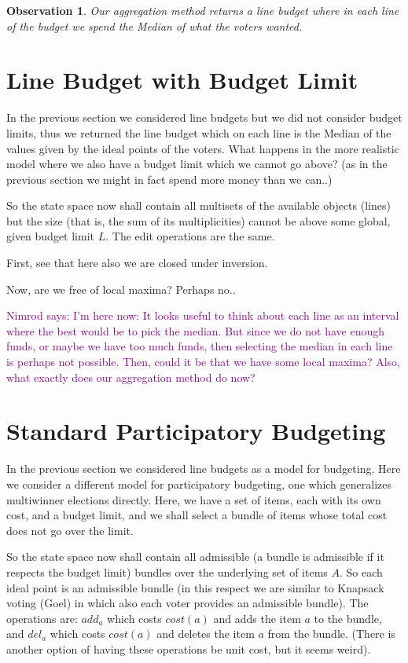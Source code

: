 \documentclass[sigconf]{aamas}  %
\newtheorem{observation}{Observation}
\newcommand{\nimrod}[1]{\textcolor{purple}{Nimrod says: #1}}
\begin{document}
\begin{observation}
Our aggregation method returns a line budget where in each line of the budget we spend the Median of what the voters wanted.
\end{observation}


\section{Line Budget with Budget Limit}

In the previous section we considered line budgets but we did not consider budget limits, thus we returned the line budget which on each line is the Median of the values given by the ideal points of the voters.
What happens in the more realistic model where we also have a budget limit which we cannot go above? (as in the previous section we might in fact spend more money than we can..)

So the state space now shall contain all multisets of the available objects (lines) but the size (that is, the sum of its multiplicities) cannot be above some global, given budget limit $L$. The edit operations are the same. 

First, see that here also we are closed under inversion.

Now, are we free of local maxima? Perhaps no..

\nimrod{I'm here now:
  It looks useful to think about each line as an interval where the best would be to pick the median. But since we do not have enough funds, or maybe we have too much funds, then selecting the median in each line is perhaps not possible. Then, could it be that we have some local maxima? Also, what exactly does our aggregation method do now?}


\section{Standard Participatory Budgeting}

In the previous section we considered line budgets as a model for budgeting.
Here we consider a different model for participatory budgeting, one which generalizes multiwinner elections directly. Here, we have a set of items, each with its own cost, and a budget limit, and we shall select a bundle of items whose total cost does not go over the limit.

So the state space now shall contain all admissible (a bundle is admissible if it respects the budget limit) bundles over the underlying set of items $A$. So each ideal point is an admissible bundle (in this respect we are similar to Knapsack voting (Goel) in which also each voter provides an admissible bundle).
The operations are: $add_a$ which costs $cost(a)$ and adds the item $a$ to the bundle, and $del_a$ which costs $cost(a)$ and deletes the item $a$ from the bundle. (There is another option of having these operations be unit cost, but it seems weird).
\end{document}
